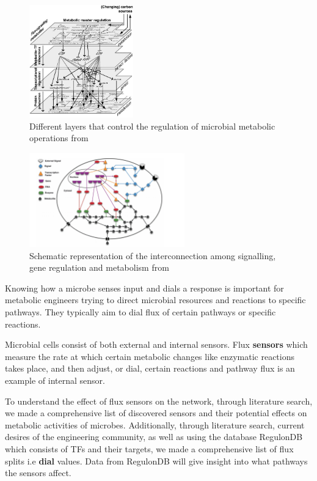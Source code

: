 \documentclass[12pt,chapterheads]{ucsd}
\begin{document}
\begin{figure}[h] 
\centering
\includegraphics[width=0.4\textwidth]{metabolic_reg}
\caption[Different layers that control the regulation of microbial metabolic operations]
{Different layers that control the regulation of microbial metabolic operations from \cite{Kotte2010}}
\label{fig:mlayers}
\end{figure}

\begin{figure}[h] 
\centering
\includegraphics[width=0.6\textwidth]{regulatory_network}
\caption[Schematic representation of the interconnection among signalling, gene regulation and metabolism]
{Schematic representation of the interconnection among signalling, gene regulation and metabolism from \cite{C3MB25489E}}
\label{fig:reg_net}
\end{figure}

Knowing how a microbe senses input and dials a response is important for metabolic engineers trying to direct microbial resources and reactions to specific pathways. They typically aim to dial flux of certain pathways or specific reactions. 

Microbial cells consist of both external and internal sensors. Flux \textbf{sensors} which measure the rate at which certain metabolic changes like enzymatic reactions takes place, and then adjust, or dial, certain reactions and pathway flux is an example of internal sensor.

To understand the effect of flux sensors on the network, through literature search, we made a comprehensive list of discovered sensors and their potential effects on metabolic activities of microbes. Additionally, through literature search, current desires of the engineering community, as well as using the database RegulonDB \cite{doi:10.1093/nar/gkv1156} which consists of TFs and their targets, we made a comprehensive list of flux splits i.e \textbf{dial} values. Data from RegulonDB will give insight into what pathways the sensors affect.
\end{document}
